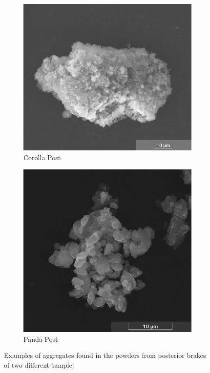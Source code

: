 \begin{figure}[H]
\centering
\begin{subfigure}{.5\textwidth}
  \centering
  \includegraphics[width=1\linewidth]{images/COROLLA-POST01.png}
  \caption{Corolla Post}
  \label{fig:Aggregates_Corolla_Post}
\end{subfigure}%
\begin{subfigure}{.5\textwidth}
  \centering
  \includegraphics[width=0.9\linewidth]{images/PANDA-POST02.png}
  \caption{Panda Post}
  \label{fig:Aggregates_Panda_Post}
\end{subfigure}
\caption{Examples of aggregates found in the powders from posterior brakes of two different sample.}
\label{fig:Aggregates_Post}
\end{figure}

